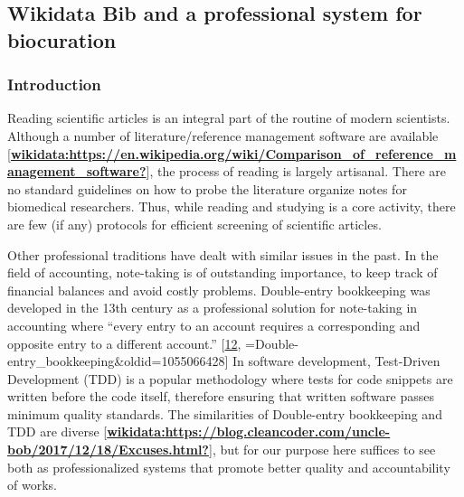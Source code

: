\hypertarget{wikidata-bib-and-a-professional-system-for-biocuration}{%
\subsection{Wikidata Bib and a professional system for biocuration}\label{wikidata-bib-and-a-professional-system-for-biocuration}}

\hypertarget{introduction}{%
\subsubsection{Introduction}\label{introduction}}

Reading scientific articles is an integral part of the routine of modern scientists.
Although a number of literature/reference management software are available {[}\protect\hyperlink{ref-wikidata:https:ux2fux2fen.wikipedia.orgux2fwikiux2fComparison_of_reference_management_software}{\textbf{wikidata:https://en.wikipedia.org/wiki/Comparison\_of\_reference\_management\_software?}}{]}, the process of reading is largely artisanal.
There are no standard guidelines on how to probe the literature organize notes for biomedical researchers.
Thus, while reading and studying is a core activity, there are few (if any) protocols for efficient screening of scientific articles.

Other professional traditions have dealt with similar issues in the past.
In the field of accounting, note-taking is of outstanding importance, to keep track of financial balances and avoid costly problems.
Double-entry bookkeeping was developed in the 13th century as a professional solution for note-taking in accounting where ``every entry to an account requires a corresponding and opposite entry to a different account.'' {[}\protect\hyperlink{ref-uYuz0opI}{12}, =Double-entry\_bookkeeping\&oldid=1055066428{]}
In software development, Test-Driven Development (TDD) is a popular methodology where tests for code snippets are written before the code itself, therefore ensuring that written software passes minimum quality standards.
The similarities of Double-entry bookkeeping and TDD are diverse {[}\protect\hyperlink{ref-wikidata:https:ux2fux2fblog.cleancoder.comux2funcle-bobux2f2017ux2f12ux2f18ux2fExcuses.html}{\textbf{wikidata:https://blog.cleancoder.com/uncle-bob/2017/12/18/Excuses.html?}}{]}, but for our purpose here suffices to see both as professionalized systems that promote better quality and accountability of works.


